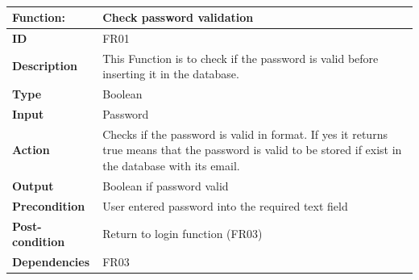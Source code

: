 \documentclass[]{article}
\begin{document}
\FloatBarrier
\begin{table}[h]
\caption{ }
\label{tab:my-table}
\begin{tabular}{|p{}|p{}|}
\hline
\textbf{Function:} & Check password validation
\\ \hline
\textbf{ID}  &     FR01       

\\ \hline
\textbf{Description}    &      This Function is to check if the password is valid before inserting it in the database.                                                              
\\ \hline
\textbf{Type}    &         Boolean

\\ \hline
\textbf{Input}        & Password


\\ \hline
\textbf{Action}            & Checks if the password is valid in format. If yes it returns true means that the password is valid to be stored if exist in the database with its email.

\\ \hline
\textbf{Output}            & Boolean if password valid

\\ \hline
\textbf{Precondition}           &   User entered password into the required text field

\\ \hline
\textbf{Post-condition}           & Return to login function (FR03)


\\ \hline
\textbf{Dependencies}           & FR03
\\ \hline
\end{tabular}
\end{table}
\end{document}
